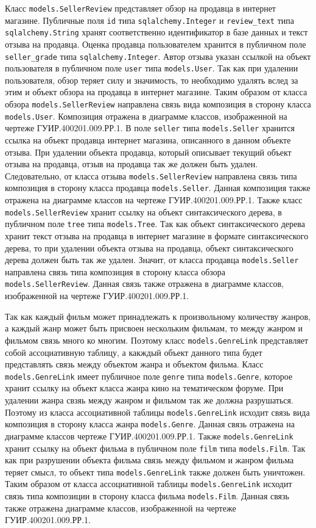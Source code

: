 Класс \texttt{models.SellerReview} представляет обзор на продавца в интернет магазине. Публичные поля \texttt{id} типа \texttt{sqlalchemy.Integer} и \texttt{review\_text} типа \texttt{sqlalchemy.String} хранят соответственно идентификатор в базе данных и текст отзыва на продавца. Оценка продавца пользователем хранится в публичном поле \texttt{seller\_grade} типа \texttt{sqlalchemy.Integer}. Автор отзыва указан ссылкой на объект пользователя в публичном поле \texttt{user} типа \texttt{models.User}. Так как при удалении пользователя, обзор теряет силу и значимость, то необходимо удалять вслед за этим и объект обзора на продавца в интернет магазине. Таким образом от класса обзора \texttt{models.SellerReview} направлена связь вида композиция в сторону класса \texttt{models.User}. Композиция отражена в диаграмме классов, изображенной на чертеже ГУИР.400201.009.РР.1. В поле \texttt{seller} типа \texttt{models.Seller} хранится ссылка на объект продавца интернет магазина, описанного в данном объекте отзыва. При удалении объекта продавца, который описывает текущий объект отзыва на продавца, отзыв на продавца так же должен быть удален. Следовательно, от класса отзыва \texttt{models.SellerReview} направлена связь типа композиция в сторону класса продавца \texttt{models.Seller}. Данная композиция также отражена на диаграмме классов на чертеже ГУИР.400201.009.РР.1. Также класс \texttt{models.SellerReview} хранит ссылку на объект синтаксического дерева, в публичном поле \texttt{tree} типа \texttt{models.Tree}. Так как объект синтаксического дерева хранит текст отзыва на продавца в интернет магазине в формате синтаксического дерева, то при удалении объекта отзыва на продавца, объект синтаксического дерева должен быть так же удален. Значит, от класса продавца \texttt{models.Seller} направлена связь типа композиция в сторону класса обзора \texttt{models.SellerReview}. Данная связь также отражена в диаграмме классов, изображенной на чертеже ГУИР.400201.009.РР.1.

Так как каждый фильм может принадлежать к произвольному количеству жанров, а каждый жанр может быть присвоен нескольким фильмам, то между жанром и фильмом связь много ко многим. Поэтому класс \texttt{models.GenreLink} представляет собой ассоциативную таблицу, а какждый объект данного типа будет представлять связь между объектом жанра и объектом фильма. Класс \texttt{models.GenreLink} имеет публичное поле \texttt{genre} типа \texttt{models.Genre}, которое хранит ссылку на объект класса жанра кино на тематическом форуме. При удалении жанра свзяь между жанром и фильмом так же должна разрушаться. Поэтому из класса ассоциативной таблицы \texttt{models.GenreLink} исходит связь вида композиция в сторону класса жанра \texttt{models.Genre}. Данная связь отражена на диаграмме классов чертеже ГУИР.400201.009.РР.1. Также \texttt{models.GenreLink} хранит ссылку на объект фильма в публичном поле \texttt{film} типа \texttt{models.Film}. Так как при разрушении объекта фильма связь между фильмом и жанром фильма теряет смысл, то объект типа \texttt{models.GenreLink} также должен быть уничтожен. Таким образом от класса ассоциативной таблицы \texttt{models.GenreLink} исходит связь типа композиции в сторону класса фильма \texttt{models.Film}. Данная связь также отражена диаграмме классов, изображенной на чертеже ГУИР.400201.009.РР.1.

